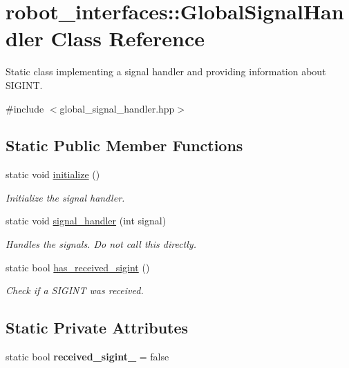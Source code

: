 \hypertarget{classrobot__interfaces_1_1GlobalSignalHandler}{}\section{robot\+\_\+interfaces\+:\+:Global\+Signal\+Handler Class Reference}
\label{classrobot__interfaces_1_1GlobalSignalHandler}


Static class implementing a signal handler and providing information about S\+I\+G\+I\+NT.  




{\ttfamily \#include $<$global\+\_\+signal\+\_\+handler.\+hpp$>$}

\subsection*{Static Public Member Functions}
\begin{DoxyCompactItemize}
\item 
static void \hyperlink{classrobot__interfaces_1_1GlobalSignalHandler_af7503f0022d78843f85062d7b602fe4b}{initialize} ()
\begin{DoxyCompactList}\small\item\em Initialize the signal handler. \end{DoxyCompactList}\item 
static void \hyperlink{classrobot__interfaces_1_1GlobalSignalHandler_a55da931218f7d10052c233832456c601}{signal\+\_\+handler} (int signal)\hypertarget{classrobot__interfaces_1_1GlobalSignalHandler_a55da931218f7d10052c233832456c601}{}\label{classrobot__interfaces_1_1GlobalSignalHandler_a55da931218f7d10052c233832456c601}

\begin{DoxyCompactList}\small\item\em Handles the signals. Do not call this directly. \end{DoxyCompactList}\item 
static bool \hyperlink{classrobot__interfaces_1_1GlobalSignalHandler_a7d24e6a71be9282a270e92be4e3808b9}{has\+\_\+received\+\_\+sigint} ()
\begin{DoxyCompactList}\small\item\em Check if a S\+I\+G\+I\+NT was received. \end{DoxyCompactList}\end{DoxyCompactItemize}
\subsection*{Static Private Attributes}
\begin{DoxyCompactItemize}
\item 
static bool {\bfseries received\+\_\+sigint\+\_\+} = false\hypertarget{classrobot__interfaces_1_1GlobalSignalHandler_ae0c579060c4b33139ed9f23c6398fe01}{}\label{classrobot__interfaces_1_1GlobalSignalHandler_ae0c579060c4b33139ed9f23c6398fe01}

\end{DoxyCompactItemize}


